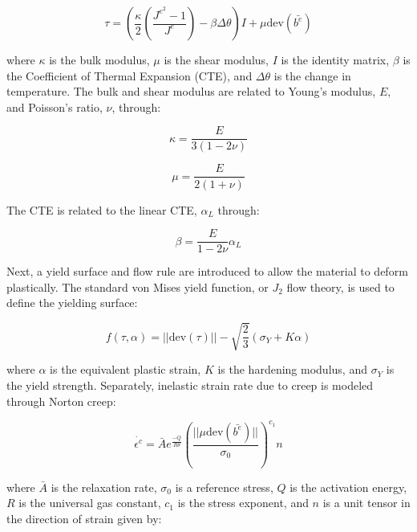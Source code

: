 \documentclass[conf]{new-aiaa}
\begin{document}
\begin{equation}
  \tau = \left( \frac{\kappa}{2} \left( \frac{J^{e^2} - 1}{J^e} \right) - \beta \Delta \theta \right) I + \mu \text{dev}( \bar{b^e})
\end{equation}

\noindent
where $\kappa$ is the bulk modulus, 
$\mu$ is the shear modulus,
$I$ is the identity matrix,
$\beta$ is the Coefficient of Thermal Expansion (CTE),
and
$\Delta \theta$ is the change in temperature.
The bulk and shear modulus are related to 
Young's modulus, $E$, and Poisson's ratio, $\nu$, through:

\begin{equation}
  \kappa = \frac{E}{3(1-2\nu)}
\end{equation}

\begin{equation}
  \mu = \frac{E}{2(1+\nu)}
\end{equation}

\noindent
The CTE is related to the linear CTE, $\alpha_L$ through:

\begin{equation}
  \beta = \frac{ E}{ 1-2\nu} \alpha_L
\end{equation}

Next, a yield surface and flow rule are introduced to allow the material 
to deform plastically.
The standard von Mises yield function, or $J_2$ flow theory, is used to 
define the yielding surface:

\begin{equation}
  f(\tau, \alpha) = || \text{dev}(\tau) || - \sqrt{\frac{2}{3}}( \sigma_Y + K \alpha)
\end{equation}

\noindent
where $\alpha$ is the equivalent plastic strain,
$K$ is the hardening modulus,
and $\sigma_Y$ is the yield strength.
Separately, inelastic strain rate due to creep is modeled 
through Norton creep:


\begin{equation}
  \dot{\epsilon^c} = \bar{A} e^{\frac{-Q}{R \theta}} \left( \frac{ || \mu \text{dev}(\bar{b^e})||}{\sigma_0} \right)^{c_1} n
\label{eq_norton_creep}
\end{equation}

\noindent
where $\bar{A}$ is the relaxation rate, 
$\sigma_0$ is a reference stress,
$Q$ is the activation energy,
$R$ is the universal gas constant,
$c_1$ is the stress exponent,
and 
$n$ is a unit tensor in the direction of strain given by:
\end{document}
